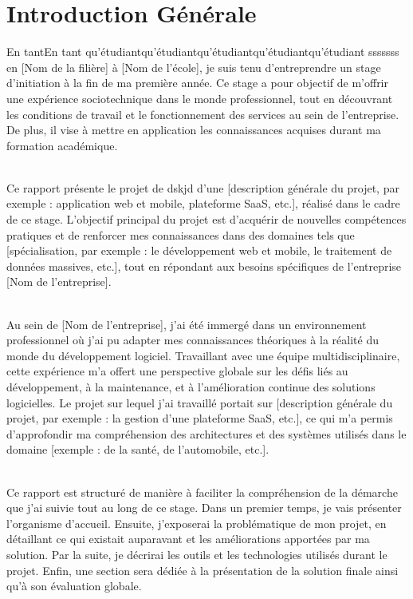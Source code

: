\chapter*{\Huge Introduction Générale
 }

 En tantEn tant qu’étudiantqu’étudiantqu’étudiantqu’étudiantqu’étudiant sssssss en [Nom de la filière] à [Nom de l'école], je suis tenu d’entreprendre un stage d’initiation à la fin de ma première année. Ce stage a pour objectif de m'offrir une expérience sociotechnique dans le monde professionnel, tout en découvrant les conditions de travail et le fonctionnement des services au sein de l’entreprise. De plus, il vise à mettre en application les connaissances acquises durant ma formation académique.\\\

Ce rapport présente le projet de dskjd d’une [description générale du projet, par exemple : application web et mobile, plateforme SaaS, etc.], réalisé dans le cadre de ce stage. L’objectif principal du projet est d'acquérir de nouvelles compétences pratiques et de renforcer mes connaissances dans des domaines tels que [spécialisation, par exemple : le développement web et mobile, le traitement de données massives, etc.], tout en répondant aux besoins spécifiques de l’entreprise [Nom de l'entreprise].\\\

Au sein de [Nom de l'entreprise], j’ai été immergé dans un environnement professionnel où j’ai pu adapter mes connaissances théoriques à la réalité du monde du développement logiciel. Travaillant avec une équipe multidisciplinaire, cette expérience m'a offert une perspective globale sur les défis liés au développement, à la maintenance, et à l'amélioration continue des solutions logicielles. Le projet sur lequel j’ai travaillé portait sur [description générale du projet, par exemple : la gestion d'une plateforme SaaS, etc.], ce qui m'a permis d'approfondir ma compréhension des architectures et des systèmes utilisés dans le domaine [exemple : de la santé, de l’automobile, etc.].\\\

Ce rapport est structuré de manière à faciliter la compréhension de la démarche que j'ai suivie tout au long de ce stage. Dans un premier temps, je vais présenter l’organisme d’accueil. Ensuite, j'exposerai la problématique de mon projet, en détaillant ce qui existait auparavant et les améliorations apportées par ma solution. Par la suite, je décrirai les outils et les technologies utilisés durant le projet. Enfin, une section sera dédiée à la présentation de la solution finale ainsi qu'à son évaluation globale.\\\

\vspace{1cm}




